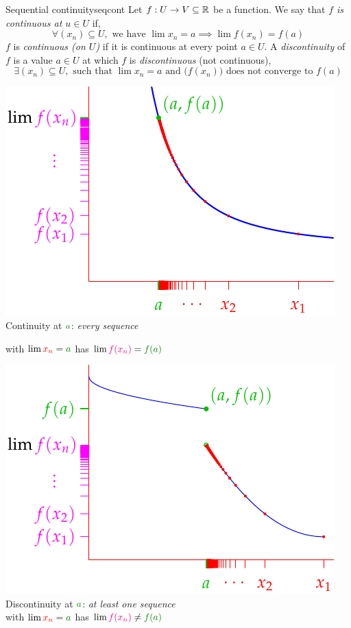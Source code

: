 \begin{defn}{Sequential continuity}{seqcont}
	Let $f:U\to V\subseteq\mathbb{R}$ be a function. We say that \emph{$f$ is continuous at $u\in U$} if,
	\[\forall (x_n)\subseteq U,\text{ we have }\lim x_n=a\implies\lim f(x_n)=f(a)\]
	$f$ is \emph{continuous (on $U$)} if it is continuous at every point $a\in U$.\smallbreak
	A \emph{discontinuity} of $f$ is a value $a\in U$ at which $f$ is \emph{discontinuous} (not continuous),
	\[\exists (x_n)\subseteq U,\text{ such that }\lim x_n=a\text{ and }\bigl(f(x_n)\bigr)\text{ does not converge to $f(a)$}\]
	\begin{minipage}[t]{0.49\linewidth}\vspace{0pt}
		\centering
		\includegraphics{contdef-pic4}\\
		Continuity at $\textcolor{Green}{a}$: \emph{every sequence}\par
		with $\lim\textcolor{red}{x_n}=\textcolor{Green}{a}$ has $\lim\textcolor{magenta}{f(x_n)}=\textcolor{Green}{f(a)}$
	\end{minipage}
	\hfill
	\begin{minipage}[t]{0.49\linewidth}\vspace{0pt}
		\centering
		\includegraphics{contdef-pic2}\\
		Discontinuity at $\textcolor{Green}{a}$: \emph{at least one sequence}\\
		with $\lim\textcolor{red}{x_n}=\textcolor{Green}{a}$ has $\lim\textcolor{magenta}{f(x_n)}\neq \textcolor{Green}{f(a)}$
	\end{minipage}
\end{defn}


